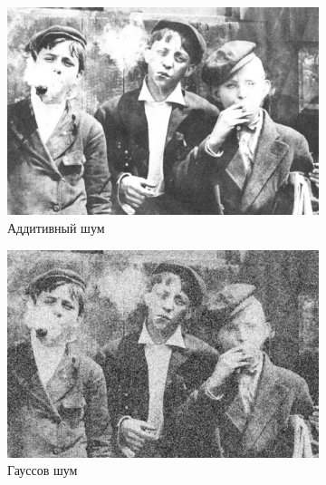 \begin{figure}[ht]
\begin{subfigure}[b]{0.5\linewidth}
      \includegraphics[width=0.95\linewidth]{../Contraharmonic_Filter/Contraharmonic_Additive_noise_(m,n=(3,_3),q=0.5).jpg} 
      \caption{Аддитивный шум} 
      \label{contraharmonic_0.5:c} 
      \vspace{4ex}
    \end{subfigure}%
    \begin{subfigure}[b]{0.5\linewidth}
      \centering
      \includegraphics[width=0.95\linewidth]{../Contraharmonic_Filter/Contraharmonic_Gaussian_noise_(m,n=(3,_3),q=0.5).jpg} 
      \caption{Гауссов шум} 
      \label{contraharmonic_0.5:d} 
      \vspace{4ex}
    \end{subfigure}
    \begin{subfigure}[b]{0.5\linewidth}
      \centering

\end{subfigure}
\end{figure}
